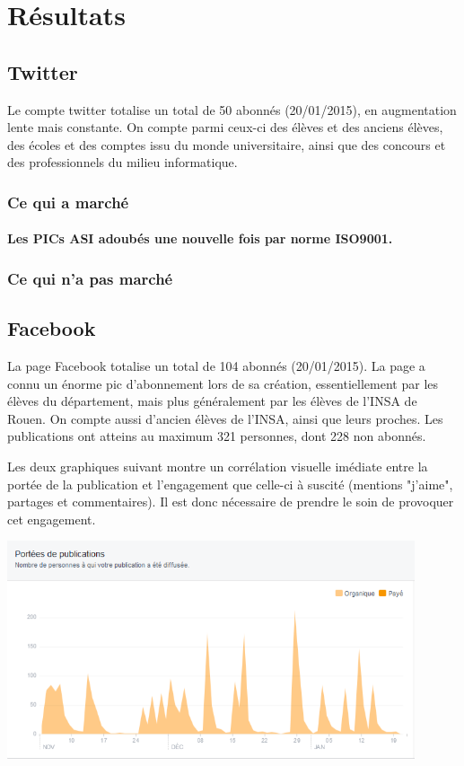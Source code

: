 \section{Résultats}

\subsection{Twitter}

Le compte twitter totalise un total de 50 abonnés (20/01/2015), en augmentation lente mais constante. On compte parmi ceux-ci des élèves et des anciens élèves, des écoles et des comptes issu du monde universitaire, ainsi que des concours et des professionnels du milieu informatique.


\subsubsection{Ce qui a marché}
\paragraph{Les PICs ASI adoubés une nouvelle fois par norme ISO9001.}
\subsubsection{Ce qui n'a pas marché}

\subsection{Facebook}

La page Facebook totalise un total de 104 abonnés (20/01/2015). La page a connu un énorme pic d'abonnement lors de sa création, essentiellement par les élèves du département, mais plus généralement par les élèves de l'INSA de Rouen. On compte aussi d'ancien élèves de l'INSA, ainsi que leurs proches. Les publications ont atteins au maximum 321 personnes, dont 228 non abonnés.

Les deux graphiques suivant montre un corrélation visuelle imédiate entre la portée de la publication et l'engagement que celle-ci à suscité (mentions "j'aime", partages et commentaires). Il est donc nécessaire de prendre le soin de provoquer cet engagement. 
\begin{center}
\includegraphics[width=0.90\textwidth]{images/PorteeDesPublication.png}
\end{center}


